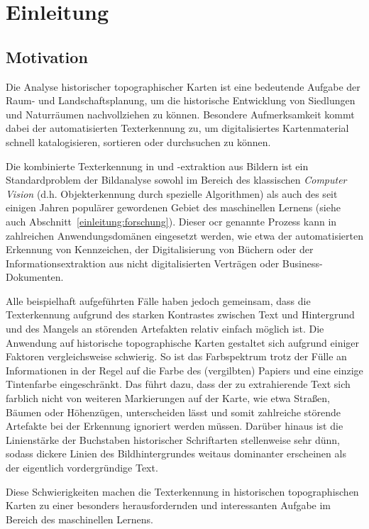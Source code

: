 \section{Einleitung}
\label{einleitung}

\subsection{Motivation}
\label{einleitung:motivation}

Die Analyse historischer topographischer Karten ist eine bedeutende Aufgabe der Raum- und Landschaftsplanung, um die
historische Entwicklung von Siedlungen und Naturräumen nachvollziehen zu können. Besondere Aufmerksamkeit kommt dabei
der automatisierten Texterkennung zu, um digitalisiertes Kartenmaterial schnell katalogisieren, sortieren oder
durchsuchen zu können.

Die kombinierte Texterkennung in und -extraktion aus Bildern ist ein Standardproblem der Bildanalyse sowohl im Bereich
des klassischen \textit{Computer Vision} (d.h. Objekterkennung durch spezielle Algorithmen) als auch des seit einigen
Jahren populärer gewordenen Gebiet des maschinellen Lernens (siehe auch Abschnitt~\ref{einleitung:forschung}). Dieser
\gls{ocr} genannte Prozess kann in zahlreichen Anwendungsdomänen eingesetzt werden, wie etwa der automatisierten
Erkennung von Kennzeichen, der Digitalisierung von Büchern oder der Informationsextraktion aus nicht digitalisierten
Verträgen oder Business-Dokumenten.

Alle beispielhaft aufgeführten Fälle haben jedoch gemeinsam, dass die Texterkennung aufgrund des starken Kontrastes
zwischen Text und Hintergrund und des Mangels an störenden Artefakten relativ einfach möglich ist. Die Anwendung auf
historische topographische Karten gestaltet sich aufgrund einiger Faktoren vergleichsweise schwierig. So ist das
Farbspektrum trotz der Fülle an Informationen in der Regel auf die Farbe des (vergilbten) Papiers und eine einzige
Tintenfarbe eingeschränkt. Das führt dazu, dass der zu extrahierende Text sich farblich nicht von weiteren Markierungen
auf der Karte, wie etwa Straßen, Bäumen oder Höhenzügen, unterscheiden lässt und somit zahlreiche störende Artefakte
bei der Erkennung ignoriert werden müssen. Darüber hinaus ist die Linienstärke der Buchstaben historischer Schriftarten
stellenweise sehr dünn, sodass dickere Linien des Bildhintergrundes weitaus dominanter erscheinen als der eigentlich
vordergründige Text.

Diese Schwierigkeiten machen die Texterkennung in historischen topographischen Karten zu einer besonders
herausfordernden und interessanten Aufgabe im Bereich des maschinellen Lernens.

